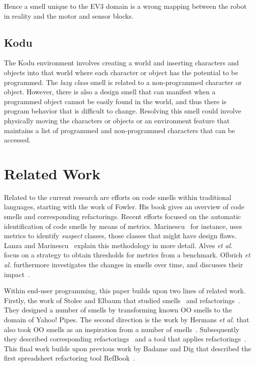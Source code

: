 \documentclass{sig-alternate}
\begin{document}
Hence a smell unique to the EV3 domain is a wrong mapping between the robot in reality and the motor and sensor blocks. 







\subsection{Kodu}
The Kodu environment involves creating a world and inserting characters and objects into that world where each character or object has the potential to be programmed. The \emph{lazy class} smell is related to a non-programmed character or object. However, there is also a design smell that can manifest when a programmed object cannot be easily found in the world, and thus there is program behavior that is difficult to change. Resolving this smell could involve physically moving the characters or objects or an environment feature that maintains a list of programmed and non-programmed characters that can be accessed. 	 



\section{Related Work}

\label{sec:related_work}
Related to the current research are efforts on code smells within traditional languages, starting with the work of Fowler\cite{Fowl1999}. His book gives an overview of code smells and corresponding refactorings. Recent efforts focused on the automatic identification of code smells by means of metrics. Marinescu~\cite{Mari2001} for instance, uses metrics to identify \emph{suspect} classes, those classes that might have design flaws. Lanza and Marinescu~\cite{Lanz06} explain this methodology in more detail. Alves \emph{et al.}~\cite{Alves2010} focus on a strategy to obtain thresholds for metrics from a benchmark. Olbrich \emph{et al.} furthermore investigates the changes in smells over time, and discusses their impact~\cite{Olbr2009}.

Within end-user programming, this paper builds upon two lines of related work. Firstly, the work of Stolee and Elbaum that studied smells~\cite{StoleeTSE2013} and refactorings~\cite{Stolee2011}. They designed a number of smells by transforming known OO smells to the domain of Yahoo! Pipes. The second direction is the work by Hermans \emph{et al.} that also took OO smells as an inspiration from a number of smells~\cite{Hermans2012intra, Hermans2012inter}. Subsequently they described corresponding refactorings~\cite{Hermans2012intraExt} and a tool that applies refactorings~\cite{hermans2014bumblebee}. This final work builds upon previous work by Badame and Dig that described the first spreadsheet refactoring tool RefBook~\cite{badame2012refactoring}.
\end{document}
